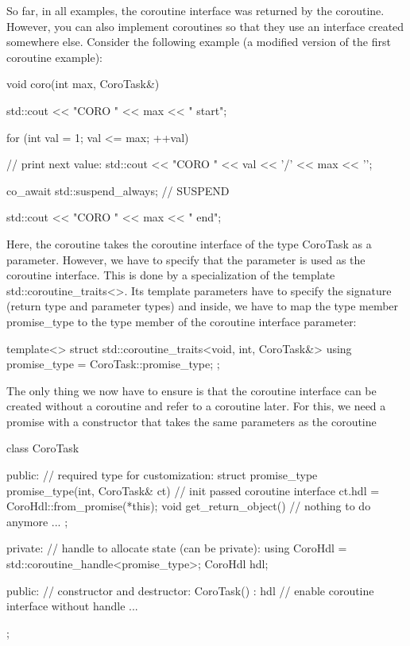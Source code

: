 So far, in all examples, the coroutine interface was returned by the coroutine. However, you can also implement coroutines so that they use an interface created somewhere else. Consider the following example (a modified version of the first coroutine example):

\begin{cpp}
void coro(int max, CoroTask&)
{
	std::cout << "CORO " << max << " start\n";
	
	for (int val = 1; val <= max; ++val) {
		// print next value:
		std::cout << "CORO " << val << '/' << max << '\n';
		
		co_await std::suspend_always{}; // SUSPEND
	}
	
	std::cout << "CORO " << max << " end\n";
}
\end{cpp}

Here, the coroutine takes the coroutine interface of the type CoroTask as a parameter. However, we have to specify that the parameter is used as the coroutine interface. This is done by a specialization of the template std::coroutine\_traits<>. Its template parameters have to specify the signature (return type and parameter types) and inside, we have to map the type member promise\_type to the type member of the coroutine interface parameter:

\begin{cpp}
template<>
struct std::coroutine_traits<void, int, CoroTask&>
{
	using promise_type = CoroTask::promise_type;
};
\end{cpp}

The only thing we now have to ensure is that the coroutine interface can be created without a coroutine and refer to a coroutine later. For this, we need a promise with a constructor that takes the same parameters as the coroutine

\begin{cpp}
class CoroTask {
	public:
	// required type for customization:
	struct promise_type {
		promise_type(int, CoroTask& ct) { // init passed coroutine interface	
			ct.hdl = CoroHdl::from_promise(*this);
		}
		void get_return_object() { // nothing to do anymore
		}
		...
	};
		
private:
	// handle to allocate state (can be private):
	using CoroHdl = std::coroutine_handle<promise_type>;
	CoroHdl hdl;
	
public:
	// constructor and destructor:
	CoroTask() : hdl{} { // enable coroutine interface without handle
	}
	...
};
\end{cpp}

